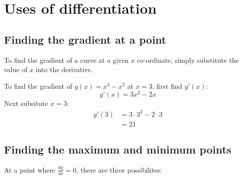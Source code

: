 \section{Uses of differentiation}
\subsection{Finding the gradient at a point}
To find the gradient of a curve at a given $x$ co-ordinate, simply substitute the value of $x$ into the derivative.
\begin{example}
To find the gradient of $y(x)=x^3 - x^2$ at $x=3$, first find $y'(x)$:
$$y'(x) = 3x^2-2x$$
Next subsitute $x=3$:
\begin{align*}y'(3)&=3\cdot3^2-2\cdot3\\&=21\end{align*}
\end{example}
\subsection{Finding the maximum and minimum points}
At a point where $\frac{dy}{dx}=0$, there are three possibilites:

